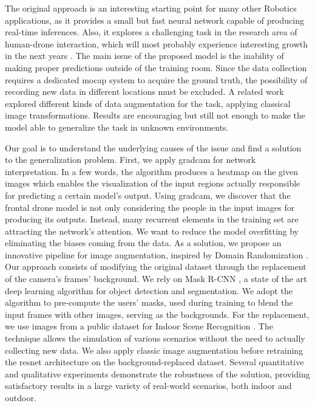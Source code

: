The original approach is an interesting starting point for many other Robotics applications, as it provides a small but fast neural network capable of producing real-time inferences. Also, it explores a challenging task in the research area of human-drone interaction, which will most probably experience interesting growth in the next years \cite{human-drone-sota}. The main issue of the proposed model is the inability of making proper predictions outside of the training room. Since the data collection requires a dedicated \gls{mocap} system to acquire the ground truth, the possibility of recording new data in different locations must be excluded. A related work \cite{zimmerman2020thesis} explored different kinds of data augmentation for the task, applying classical image transformations. Results are encouraging but still not enough to make the model able to generalize the task in unknown environments.

\medskip

Our goal is to understand the underlying causes of the issue and find a solution to the generalization problem. First, we apply \gls{gradcam} \cite{Selvaraju_2019} for network interpretation. In a few words, the algorithm produces a heatmap on the given images which enables the visualization of the input regions actually responsible for predicting a certain model’s output. Using \gls{gradcam}, we discover that the frontal drone model is not only considering the people in the input images for producing its outputs. Instead, many recurrent elements in the training set are attracting the network's attention. We want to reduce the model overfitting by eliminating the biases coming from the data. As a solution, we propose an innovative pipeline for image augmentation, inspired by Domain Randomization \cite{weng2019DR}. Our approach consists of modifying the original dataset through the replacement of the camera's frames' background. We rely on Mask R-CNN \cite{he2018mask}, a state of the art deep learning algorithm for object detection and segmentation. We adopt the algorithm to pre-compute the users' masks, used during training to blend the input frames with other images, serving as the backgrounds. For the replacement, we use images from a public dataset for Indoor Scene Recognition \cite{cvpr09}. The technique allows the simulation of various scenarios without the need to actually collecting new data. We also apply classic image augmentation before retraining the \gls{resnet} architecture on the background-replaced dataset. Several quantitative and qualitative experiments demonstrate the robustness of the solution, providing satisfactory results in a large variety of real-world scenarios, both indoor and outdoor.

